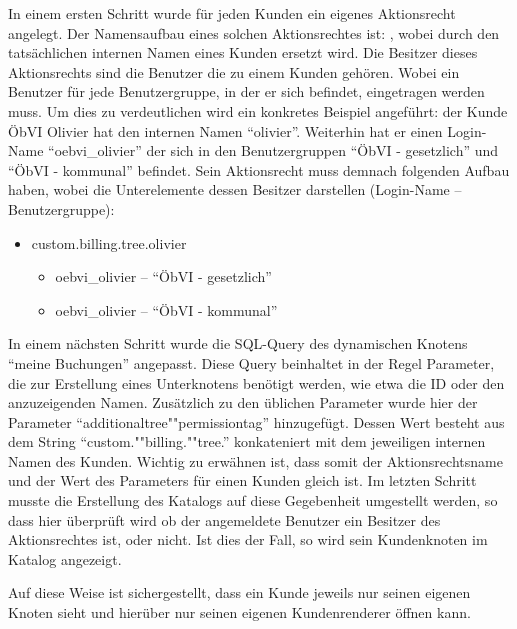 In einem ersten Schritt wurde für jeden Kunden ein eigenes Aktionsrecht angelegt.
Der Namensaufbau eines solchen Aktionsrechtes ist: , wobei  durch den tatsächlichen internen Namen eines Kunden ersetzt wird.
Die Besitzer dieses Aktionsrechts sind die Benutzer die zu einem Kunden gehören. 
Wobei ein Benutzer für jede Benutzergruppe, in der er sich befindet, eingetragen werden muss.
Um dies zu verdeutlichen wird ein konkretes Beispiel angeführt: der Kunde \ac{ÖbVI} Olivier hat den internen Namen "`olivier"'.
Weiterhin hat er einen Login-Name "`oebvi\_olivier"' der sich in den Benutzergruppen "`ÖbVI - gesetzlich"' und "`ÖbVI - kommunal"' befindet.
Sein Aktionsrecht muss demnach folgenden Aufbau haben, wobei die Unterelemente dessen Besitzer darstellen (Login-Name -- Benutzergruppe):
\begin{itemize}
\item custom.billing.tree.olivier
\begin{itemize}
\item oebvi\_olivier -- "`ÖbVI - gesetzlich"'
\item oebvi\_olivier -- "`ÖbVI - kommunal"'
\end{itemize}
\end{itemize}

In einem nächsten Schritt wurde die SQL-Query des dynamischen Knotens "`meine Buchungen"' angepasst.
Diese Query beinhaltet in der Regel Parameter, die zur Erstellung eines Unterknotens benötigt werden, wie etwa die ID oder den anzuzeigenden Namen.
Zusätzlich zu den üblichen Parameter wurde hier der Parameter "`additionaltree""permissiontag"' hinzugefügt.
Dessen Wert besteht aus dem String "`custom.""billing.""tree."' konkateniert mit dem jeweiligen internen Namen des Kunden.
Wichtig zu erwähnen ist, dass somit der Aktionsrechtsname und der Wert des Parameters für einen Kunden gleich ist. 
Im letzten Schritt musste die Erstellung des Katalogs auf diese Gegebenheit umgestellt werden, so dass hier überprüft wird ob der angemeldete Benutzer ein Besitzer des Aktionsrechtes ist, oder nicht.
Ist dies der Fall, so wird sein Kundenknoten im Katalog angezeigt.

Auf diese Weise ist sichergestellt, dass ein Kunde jeweils nur seinen eigenen Knoten sieht und hierüber nur seinen eigenen Kundenrenderer öffnen kann. 



